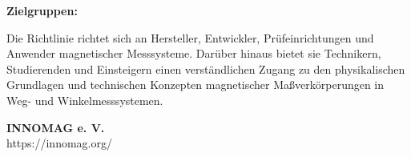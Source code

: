 {\fontsize{11pt}{16pt}\selectfont\bfseries\sffamily Zielgruppen:\\}
{\fontsize{11pt}{16pt}\selectfont\sffamily
Die Richtlinie richtet sich an Hersteller, Entwickler, Prüfeinrichtungen und Anwender magnetischer Messsysteme. Darüber hinaus bietet sie Technikern, Studierenden und Einsteigern einen verständlichen Zugang zu den physikalischen Grundlagen und technischen Konzepten magnetischer Maßverkörperungen in Weg- und Winkelmesssystemen.
\par
}

\vfill

{
\sffamily\textbf{INNOMAG e. V.}\\
https://innomag.org/
}

\vspace*{-10mm}



